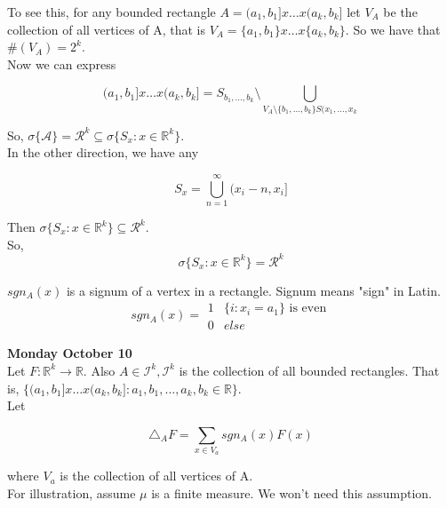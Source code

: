 \documentclass[11pt,fleqn]{book} %
\begin{document}
 To see this, for any bounded rectangle $A = (a_1, b_1] x \dots x (a_k, b_k]$ let $V_A$ be the collection of all vertices of A, that is $V_A = \{a_1, b_1 \} x \dots x \{a_k, b_k\}$. So we have that $\#(V_A) = 2^k$.\\



 Now  we can express 

 		$$(a_1, b_1] x \dots x (a_k, b_k] = S_{b_1, \dots, b_k} \setminus \bigcup_{V_A \setminus \{b_1, \dots, b_k\} S(x_1, \dots, x_k} $$

 So, $\sigma\{\mathcal{A}\} = \mathcal{R}^k \subseteq \sigma \{S_x: x \in \mathbb{R}^k \}$.\\

 In the other direction,  we have any 

 		$$S_x = \bigcup_{n=1}^\infty (x_i -n, x_i]$$

 Then $\sigma \{S_x: x \in \mathbb{R}^k \} \subseteq \mathcal{R}^k$.\\
 
 So, 
 		$$\sigma \{S_x: x \in \mathbb{R}^k \} = \mathcal{R}^k$$



\begin{notation}[Signum]
	$sgn_A (x)$ is a signum of a vertex in a rectangle. Signum means "sign" in Latin.\\


	$$sgn_A (x) = \begin{array}{ll}
		1 & \{i: x_i = a_1\} \text{ is even}\\
		0 & else
	\end{array}$$ 

\end{notation}


\textbf{Monday October 10}\\

Let $F: \mathbb{R}^k \rightarrow \mathbb{R}$. Also $A \in \mathcal{I}^k, \mathcal{I}^k$ is the collection of all bounded rectangles. That is, $\{(a_1, b_1]x \dots x (a_k, b_k]: a_1, b_1, \dots, a_k, b_k \in \mathbb{R}\}$.\\

Let 

		$$\triangle_A F = \sum_{x \in V_a} sgn_A (x) F(x)$$

where $V_a$ is the collection of all vertices of A. \\

For illustration, assume $\mu$ is a finite measure. We won't need this assumption. \\
\end{document}
